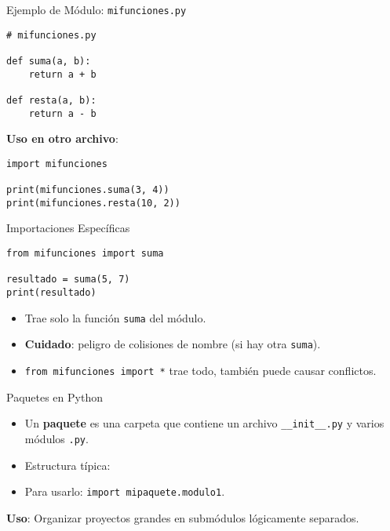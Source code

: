 \documentclass[10pt]{beamer}
\begin{document}
\begin{frame}[fragile]{Ejemplo de Módulo: \texttt{mifunciones.py}}
\begin{verbatim}
# mifunciones.py

def suma(a, b):
    return a + b

def resta(a, b):
    return a - b
\end{verbatim}
\vspace{0.3cm}
\textbf{Uso en otro archivo}:
\begin{verbatim}
import mifunciones

print(mifunciones.suma(3, 4))
print(mifunciones.resta(10, 2))
\end{verbatim}
\end{frame}

\begin{frame}[fragile]{Importaciones Específicas}
\begin{verbatim}
from mifunciones import suma

resultado = suma(5, 7)
print(resultado)
\end{verbatim}
\begin{itemize}
  \item Trae solo la función \texttt{suma} del módulo.
  \item \textbf{Cuidado}: peligro de colisiones de nombre (si hay otra \texttt{suma}).
  \item \texttt{from mifunciones import *} trae todo, también puede causar conflictos.
\end{itemize}
\end{frame}

\begin{frame}{Paquetes en Python}
  \begin{itemize}
    \item Un \textbf{paquete} es una carpeta que contiene un archivo \texttt{\_\_init\_\_.py} y varios módulos \texttt{.py}.
    \item Estructura típica:
    \item Para usarlo: \texttt{import mipaquete.modulo1}.
  \end{itemize}
  \textbf{Uso}: Organizar proyectos grandes en submódulos lógicamente separados.
\end{frame}
\end{document}
